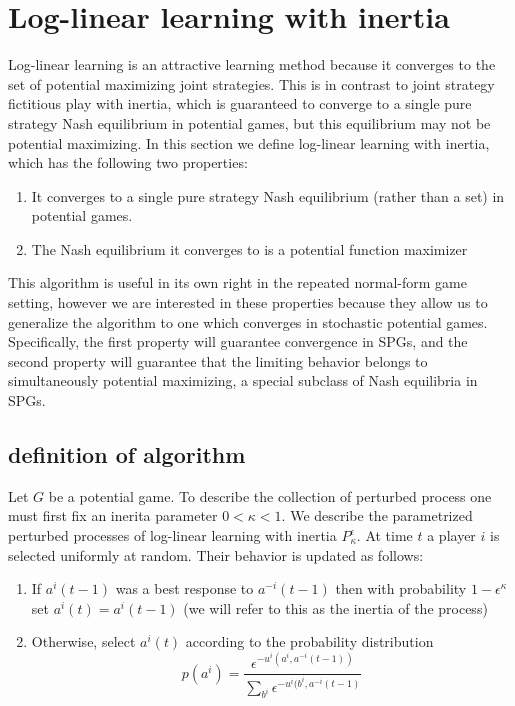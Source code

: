 \section{Log-linear learning with inertia}

Log-linear learning is an attractive learning method because it converges to the set of potential maximizing joint strategies. This is in contrast to joint strategy fictitious play with inertia, which is guaranteed to converge to a single pure strategy Nash equilibrium in potential games, but this equilibrium may not be potential maximizing. In this section we define log-linear learning with inertia, which has the following two properties:

\begin{enumerate}
    \item It converges to a single pure strategy Nash equilibrium (rather than a set) in potential games.
    \item The Nash equilibrium it converges to is a potential function maximizer
\end{enumerate}

This algorithm is useful in its own right in the repeated normal-form game setting, however we are interested in these properties because they allow us to generalize the algorithm to one which converges in stochastic potential games. Specifically, the first property will guarantee convergence in SPGs, and the second property will guarantee that the limiting behavior belongs to simultaneously potential maximizing, a special subclass of Nash equilibria in SPGs.








\subsection{definition of algorithm}

Let $G$ be a potential game. To describe the collection of perturbed process one must first fix an inerita parameter $0 < \kappa < 1$. We describe the parametrized perturbed processes of log-linear learning with inertia $P_{\kappa}^{\epsilon}$. At time $t$ a player $i$ is selected uniformly at random. Their behavior is updated as follows:

\begin{enumerate}
\item If $a^i(t-1)$ was a best response to $a^{-i}(t-1)$ then with probability $1-\epsilon^{\kappa}$ set $a^i(t) = a^i(t-1)$ (we will refer to this as the inertia of the process)
\item Otherwise, select $a^i(t)$ according to the probability distribution
$$
p(a^i) = \dfrac{\epsilon^{-u^i(a^i, a^{-i}(t-1))}}{\sum_{b^i} \epsilon^{-u^i(b^i, a^{-i}(t-1)}}
$$
\end{enumerate}

